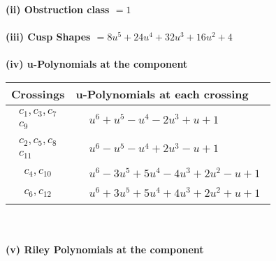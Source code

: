 \documentclass[1p]{elsarticle_modified}
\theoremstyle{definition}
\begin{document}
\flushleft \textbf{(ii) Obstruction class $= 1$}\\~\\
\flushleft \textbf{(iii) Cusp Shapes $= 8 u^5+24 u^4+32 u^3+16 u^2+4$}\\~\\
\newpage\renewcommand{\arraystretch}{1}
\flushleft \textbf{(iv) u-Polynomials at the component}\newline \\
\begin{tabular}{m{50pt}|m{274pt}}
Crossings & \hspace{64pt}u-Polynomials at each crossing \\
\hline $$\begin{aligned}c_{1},c_{3},c_{7}\\c_{9}\end{aligned}$$&$\begin{aligned}
&u^6+u^5- u^4-2 u^3+u+1
\end{aligned}$\\
\hline $$\begin{aligned}c_{2},c_{5},c_{8}\\c_{11}\end{aligned}$$&$\begin{aligned}
&u^6- u^5- u^4+2 u^3- u+1
\end{aligned}$\\
\hline $$\begin{aligned}c_{4},c_{10}\end{aligned}$$&$\begin{aligned}
&u^6-3 u^5+5 u^4-4 u^3+2 u^2- u+1
\end{aligned}$\\
\hline $$\begin{aligned}c_{6},c_{12}\end{aligned}$$&$\begin{aligned}
&u^6+3 u^5+5 u^4+4 u^3+2 u^2+u+1
\end{aligned}$\\
\hline
\end{tabular}\\~\\
\newpage\renewcommand{\arraystretch}{1}
\flushleft \textbf{(v) Riley Polynomials at the component}\newline \\
\end{document}
